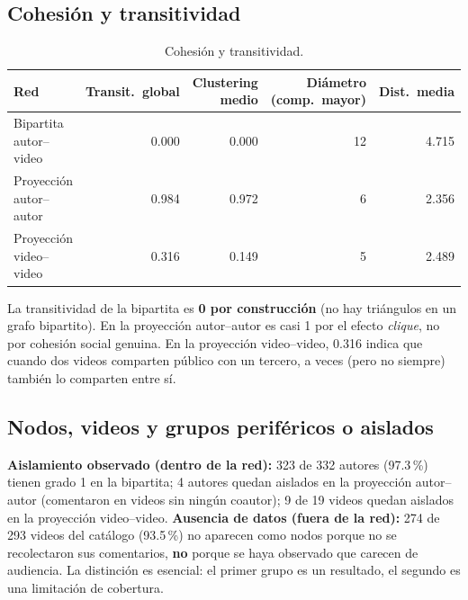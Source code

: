 \documentclass[11pt,a4paper]{article}
\begin{document}
\subsection{Cohesi\'on y transitividad}
\begin{table}[H]
\centering
\caption{Cohesi\'on y transitividad.}
\begin{tabular}{l r r r r}
\toprule
Red & Transit.\ global & Clustering medio & Di\'ametro (comp.\ mayor) & Dist.\ media \\
\midrule
Bipartita autor--video & 0.000 & 0.000 & 12 & 4.715 \\
Proyecci\'on autor--autor & 0.984 & 0.972 & 6 & 2.356 \\
Proyecci\'on video--video & 0.316 & 0.149 & 5 & 2.489 \\
\bottomrule
\end{tabular}
\end{table}
La transitividad de la bipartita es \textbf{0 por construcci\'on} (no hay tri\'angulos en un grafo
bipartito). En la proyecci\'on autor--autor es casi 1 por el efecto \emph{clique}, no por cohesi\'on
social genuina. En la proyecci\'on video--video, 0.316 indica que cuando dos videos comparten p\'ublico
con un tercero, a veces (pero no siempre) tambi\'en lo comparten entre s\'i.

\subsection{Nodos, videos y grupos perif\'ericos o aislados}
\textbf{Aislamiento observado (dentro de la red):} 323 de 332 autores (97.3\,\%) tienen grado 1 en la
bipartita; 4 autores quedan aislados en la proyecci\'on autor--autor (comentaron en videos sin ning\'un
coautor); 9 de 19 videos quedan aislados en la proyecci\'on video--video.
\textbf{Ausencia de datos (fuera de la red):} 274 de 293 videos del cat\'alogo (93.5\,\%) no aparecen
como nodos porque no se recolectaron sus comentarios, \textbf{no} porque se haya observado que carecen
de audiencia. La distinci\'on es esencial: el primer grupo es un resultado, el segundo es una
limitaci\'on de cobertura.
\end{document}

